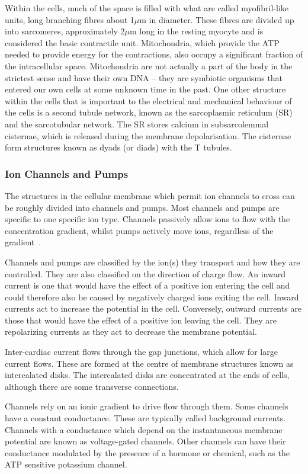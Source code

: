 Within the cells, much of the space is filled with what are called
myofibril-like units, long branching fibres about 1$\mu$m in diameter.
These fibres are divided up into sarcomeres, approximately 2$\mu$m long in the
resting myocyte and is considered the basic contractile unit.
Mitochondria, which provide the ATP needed to provide energy for the
contractions, also occupy a significant fraction of the intracellular space.
Mitochondria are not actually a part of the body in the strictest sense and
have their own DNA -- they are symbiotic organisms that entered our own cells
at some unknown time in the past.
One other structure within the cells that is important to the electrical and
mechanical behaviour of the cells is a second tubule network, known as the
sarcoplasmic reticulum (SR) and the sarcotubular network.
The SR stores calcium in subsarcolemmal cisternae, which is released during the
membrane depolarisation.
The cisternae form structures known as dyads (or diads) with the T tubules.

\subsubsection{Ion Channels and Pumps}

The structures in the cellular membrane which permit ion channels to cross can
be roughly divided into channels and pumps.
Most channels and pumps are specific to one specific ion type.
Channels passively allow ions to flow with the concentration gradient, whilst
pumps actively move ions, regardless of the gradient~\cite{Hille2001}.

Channels and pumps are classified by the ion(s) they transport and how they are
controlled.
They are also classified on the direction of charge flow.
An inward current is one that would have the effect of a positive ion entering
the cell and could therefore also be caused by negatively charged ions exiting
the cell.
Inward currents act to increase the potential in the cell.
Conversely, outward currents are those that would have the effect of a positive
ion leaving the cell.
They are repolarizing currents as they act to decrease the membrane potential.

Inter-cardiac current flows through the gap junctions, which allow for large
current flows.
These are formed at the centre of membrane structures known as intercalated
disks.
The intercalated disks are concentrated at the ends of cells, although there are
some transverse connections.

Channels rely on an ionic gradient to drive flow through them.
Some channels have a constant conductance.
These are typically called background currents.
Channels with a conductance which depend on the instantaneous membrane potential
are known as voltage-gated channels.
Other channels can have their conductance modulated by the presence of a
hormone or chemical, such as the ATP sensitive potassium channel.

